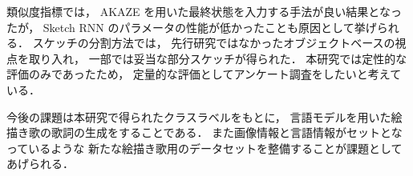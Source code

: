 \documentclass[twocolumn]{jarticle}     %
\begin{document}
類似度指標では，
AKAZE を用いた最終状態を入力する手法が良い結果となったが，
Sketch RNN のパラメータの性能が低かったことも原因として挙げられる．
スケッチの分割方法では，
先行研究ではなかったオブジェクトベースの視点を取り入れ，
一部では妥当な部分スケッチが得られた．
本研究では定性的な評価のみであったため，
定量的な評価としてアンケート調査をしたいと考えている．


今後の課題は本研究で得られたクラスラベルをもとに，
言語モデルを用いた絵描き歌の歌詞の生成をすることである．
また画像情報と言語情報がセットとなっているような
新たな絵描き歌用のデータセットを整備することが課題としてあげられる．

%
%
%



\end{document}
